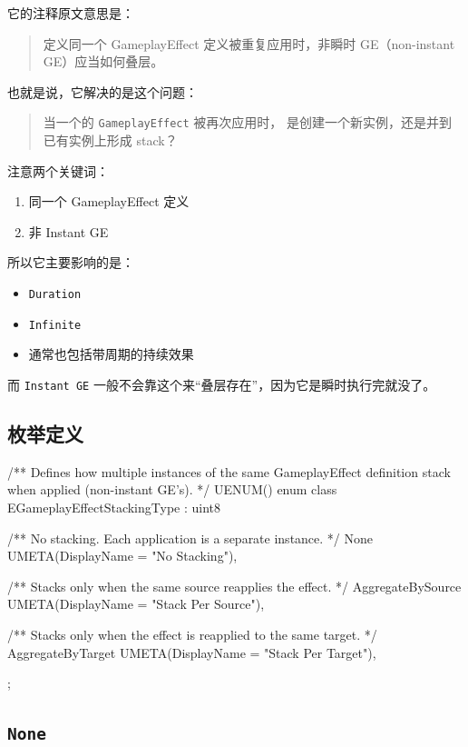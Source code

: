 它的注释原文意思是：

\begin{quote}
	定义同一个 GameplayEffect 定义被重复应用时，非瞬时 GE（non-instant GE）应当如何叠层。
\end{quote}

也就是说，它解决的是这个问题：

\begin{quote}
	当一个的 \texttt{GameplayEffect} 被再次应用时，  
	是创建一个新实例，还是并到已有实例上形成 stack？
\end{quote}

注意两个关键词：

\begin{enumerate}
	\item 同一个 GameplayEffect 定义
	\item 非 Instant GE
\end{enumerate}

所以它主要影响的是：

\begin{itemize}
	\item \texttt{Duration}
	\item \texttt{Infinite}
	\item 通常也包括带周期的持续效果
\end{itemize}

而 \texttt{Instant GE} 一般不会靠这个来“叠层存在”，因为它是瞬时执行完就没了。

\subsection{枚举定义}


\begin{code}
	/** Defines how multiple instances of the same GameplayEffect definition stack when applied (non-instant GE's). */
	UENUM()
	enum class EGameplayEffectStackingType : uint8
	{
		/** No stacking. Each application is a separate instance. */
		None UMETA(DisplayName = "No Stacking"),
		
		/** Stacks only when the same source reapplies the effect. */
		AggregateBySource UMETA(DisplayName = "Stack Per Source"),
		
		/** Stacks only when the effect is reapplied to the same target. */
		AggregateByTarget UMETA(DisplayName = "Stack Per Target"),
	};
\end{code}

\subsection{\texttt{None}}

